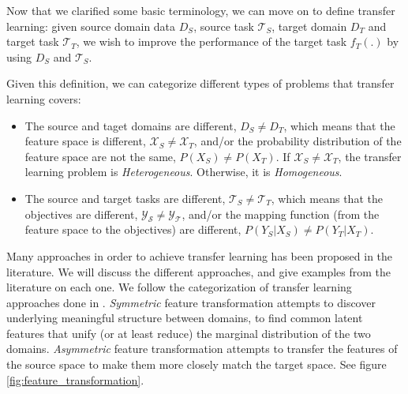   \par Now that we clarified some basic terminology, we can move on to define transfer learning: given source domain data $D_S$, source task $\mathcal{T}_S$,  target domain $D_T$ and target task $\mathcal{T}_T$, we wish to improve the performance of the target task $f_T(.)$ by using $D_S$ and $\mathcal{T}_S$.

  \par Given this definition, we can categorize different types of problems that transfer learning covers:

  \begin{itemize}
      \item The source and taget domains are different, $D_S \neq D_T$, which means that the feature space is different, $\mathcal{X}_S \neq \mathcal{X}_T$, and/or the probability distribution of the feature space are not the same, $P(X_S) \neq P(X_T)$. If $\mathcal{X}_S \neq \mathcal{X}_T$, the transfer learning problem is \textit{Heterogeneous}. Otherwise, it is \textit{Homogeneous}.

      \item The source and target tasks are different, $\mathcal{T}_S \neq \mathcal{T}_T$, which means that the objectives are different, $\mathcal{Y_S} \neq \mathcal{Y_T}$, and/or the mapping function (from the feature space to the objectives) are different, $P(Y_S|X_S) \neq P(Y_T|X_T)$.
  \end{itemize}

  \par Many approaches in order to achieve transfer learning has been proposed in the literature. We will discuss the different approaches, and give examples from the literature on each one. We follow the categorization of transfer learning approaches done in \citep{weiss2016survey}.
  \textit{Symmetric} feature transformation attempts to discover underlying meaningful structure between domains, to find common latent features that unify (or at least reduce) the marginal distribution of the two domains. \textit{Asymmetric} feature transformation attempts to transfer the features of the source space to make them more closely match the target space. See figure \ref{fig:feature_transformation}.

